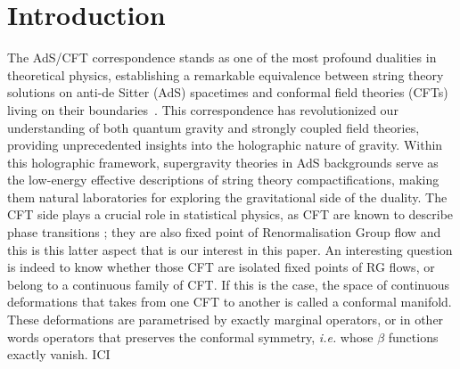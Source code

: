\documentclass[11pt,a4paper]{article}
\newcommand{\ce}[1]{\marginpar{\parbox{\marginparwidth}{\boldmath $\Longleftarrow$}}{\boldmath\bfseries (ce: #1)}}
\begin{document}
\tableofcontents



\section{Introduction}

The AdS/CFT correspondence stands as one of the most profound dualities in theoretical physics, establishing a remarkable equivalence between string theory solutions on anti-de Sitter (AdS) spacetimes and conformal field theories (CFTs) living on their boundaries~\cite{Maldacena:1997re}. This correspondence has revolutionized our understanding of both quantum gravity and strongly coupled field theories, providing unprecedented insights into the holographic nature of gravity. Within this holographic framework, supergravity theories in AdS backgrounds serve as the low-energy effective descriptions of string theory compactifications, making them natural laboratories for exploring the gravitational side of the duality. The CFT side plays a crucial role in statistical physics, as CFT are known to describe phase transitions ; they are also fixed point of Renormalisation Group flow and this is this latter aspect that is our interest in this paper. An interesting question is indeed to know whether those CFT are isolated fixed points of RG flows, or belong to a continuous family of CFT. If this is the case, the space of continuous deformations that takes from one CFT to another is called a conformal manifold. These deformations are parametrised by exactly marginal operators, or in other words operators that preserves the conformal symmetry, \textit{i.e.} whose $\beta$ functions exactly vanish. ICI \ce{Needs some modifications.}
\end{document}
